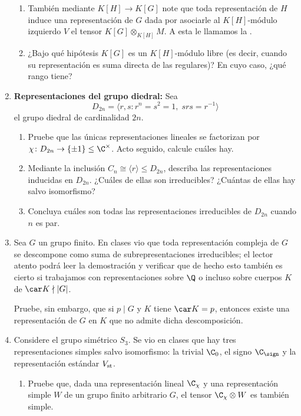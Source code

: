 \documentclass[11pt, reqno]{amsart}
\begin{document}
\begin{enumerate}
\begin{enumerate}
			\item También mediante $K[H] \to K[G]$ note que toda representación de $H$ induce una
				representación de $G$ dada por asociarle al $K[H]$-módulo izquierdo $V$ el tensor $K[G]
				\otimes_{K[H]} M$.
				A esta le llamamos la .

			\item ¿Bajo qué hipótesis $K[G]$ es un $K[H]$-módulo libre (es decir, cuando su representación es suma directa de las regulares)?
				En cuyo caso, ¿qué rango tiene?
		\end{enumerate}

		\newex
	\item \textbf{Representaciones del grupo diedral:}
		Sea
		\[
			D_{2n} = \langle r, s : r^n = s^2 = 1, \; srs = r^{-1} \rangle
		\]
		el grupo diedral de cardinalidad $2n$.
		\begin{enumerate}
			\item Pruebe que las únicas representaciones lineales se factorizan por $\chi \colon D_{2n} \to \{ \pm 1 \} \le \C^\times$.
				Acto seguido, calcule cuáles hay.

			\item Mediante la inclusión $C_n \cong \langle r \rangle \le D_{2n}$, describa las representaciones inducidas en $D_{2n}$.
				¿Cuáles de ellas son irreducibles? ¿Cuántas de ellas hay salvo isomorfismo?

			\item Concluya cuáles son todas las representaciones irreducibles de $D_{2n}$ cuando $n$ es par.
		\end{enumerate}
		\nocite{serre:representations}

		\newex
	\item\lookup Sea $G$ un grupo finito.
		En clases vio que toda representación compleja de $G$ se descompone como suma de subrepresentaciones irreducibles;
		el lector atento podrá leer la demostración y verificar que de hecho esto también es cierto si trabajamos con
		representaciones sobre $\Q$ o incluso sobre cuerpos $K$ de $\car K \nmid |G|$.

		Pruebe, sin embargo, que si $p \mid G$ y $K$ tiene $\car K = p$, entonces existe una representación de $G$ en $K$ que no
		admite dicha descomposición.

		\newex
	\item Considere el grupo simétrico $S_3$.
		Se vio en clases que hay tres representaciones simples salvo isomorfismo:
		la trivial $\C_0$, el signo $\C_\sign$ y la representación estándar $V_{\rm st}$.
		\begin{enumerate}
			\item Pruebe que, dada una representación lineal $\C_\chi$ y una representación simple $W$ de un grupo finito
				arbitrario $G$, el tensor $\C_\chi \otimes W$ es también simple.


\end{enumerate}
\end{enumerate}
\end{document}
